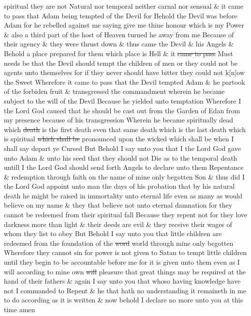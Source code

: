 spiritual they are not Natural nor temporal neither carnal nor sensual \& it came to pass that Adam being tempted of the Devil for Behold the Devil was before Adam for he rebelled against me saying give me thine honour which is my Power \& also a third part of the host of Heaven turned he away from me Because of their agency \& they were thrust down \& thus came the Devil \& his Angels \& Behold a place prepared for them which place is Hell \& it \sout{came to pass} Must needs be that the Devil should tempt the children of men or they could not be agents unto themselves for if they never should have bitter they could not k[n]ow the Sweet Wherefore it came to pass that the Devil tempted Adam \& he partook of the forbiden fruit \& transgressed the commandment wherein he became subject to the will of the Devil Because he yielded unto temptation Wherefore I the Lord God caused that he should be cast out from the Garden of Edan from my presence because of his transgression Wherein he became spiritually dead which \sout{death} is the first death even that same death which is the last death which is spiritual \sout{which shall be} pronounced upon the wicked which shall be when I shall say depart ye Cursed But Behold I say unto you that I the Lord God gave unto Adam \& unto his seed that they should not Die as to the temporal death untill I the Lord God should send forth Angels to declare unto them Repentance \& redemption through faith on the name of mine only begotten Son \& thus did I the Lord God appoint unto man the days of his probation that by his natural death he might be raised in immortality unto eternal life even as many as would believe on my name \& they that believe not unto eternal damnation for they cannot be redeemed from their spiritual fall Because they repent not for they love darkness more than light \& their deeds are evil \& they receive their wages of whom they list to obey But Behold I say unto you that little children are redeemed from the foundation of the \sout{word} world through mine only begotten Wherefore they cannot sin for power is not given to Satan to tempt little children until they begin to be accountable before me for it is given unto them even as I will according to mine own \sout{will} pleasure that great things may be required at the hand of their fathers \& again I say unto you that whoso having knowledge have not I commanded to Repent \& he that hath no understanding it remaineth in me to do according as it is written \& now behold I declare no more unto you at this time amen
				
